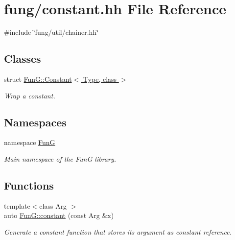 \hypertarget{constant_8hh}{\section{fung/constant.hh \-File \-Reference}
\label{constant_8hh}
}
{\ttfamily \#include \char`\"{}fung/util/chainer.\-hh\char`\"{}}\*
\subsection*{\-Classes}
\begin{DoxyCompactItemize}
\item 
struct \hyperlink{structFunG_1_1Constant}{\-Fun\-G\-::\-Constant$<$ Type, class $>$}
\begin{DoxyCompactList}\small\item\em \-Wrap a constant. \end{DoxyCompactList}\end{DoxyCompactItemize}
\subsection*{\-Namespaces}
\begin{DoxyCompactItemize}
\item 
namespace \hyperlink{namespaceFunG}{\-Fun\-G}
\begin{DoxyCompactList}\small\item\em \-Main namespace of the \-Fun\-G library. \end{DoxyCompactList}\end{DoxyCompactItemize}
\subsection*{\-Functions}
\begin{DoxyCompactItemize}
\item 
{\footnotesize template$<$class Arg $>$ }\\auto \hyperlink{namespaceFunG_a65c509062b62b3303268cabc97b75a65}{\-Fun\-G\-::constant} (const \-Arg \&x)
\begin{DoxyCompactList}\small\item\em \-Generate a constant function that stores its argument as constant reference. \end{DoxyCompactList}\end{DoxyCompactItemize}
